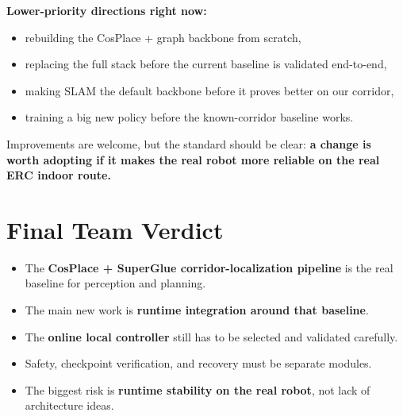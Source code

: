 \documentclass[11pt,a4paper]{article}
\begin{document}
\textbf{Lower-priority directions right now:}

\begin{itemize}[nosep]
  \item rebuilding the CosPlace + graph backbone from scratch,
  \item replacing the full stack before the current baseline is validated end-to-end,
  \item making SLAM the default backbone before it proves better on our corridor,
  \item training a big new policy before the known-corridor baseline works.
\end{itemize}

Improvements are welcome, but the standard should be clear:
\textbf{a change is worth adopting if it makes the real robot more reliable on the real ERC indoor route.}


\section{Final Team Verdict}

\begin{mdframed}
\begin{itemize}[nosep]
  \item The \textbf{CosPlace + SuperGlue corridor-localization pipeline} is the real baseline for perception and planning.
  \item The main new work is \textbf{runtime integration around that baseline}.
  \item The \textbf{online local controller} still has to be selected and validated carefully.
  \item Safety, checkpoint verification, and recovery must be separate modules.
  \item The biggest risk is \textbf{runtime stability on the real robot}, not lack of architecture ideas.
\end{itemize}
\end{mdframed}
\end{document}
